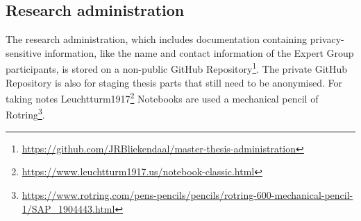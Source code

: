 \subsection{Research administration}
\label{sub:tbresearchadministration}
The research administration, which includes documentation containing privacy-sensitive information, like the name and contact information of the Expert Group participants, is stored on a non-public GitHub Repository\footnote{\url{https://github.com/JRBliekendaal/master-thesis-administration}}. The private GitHub Repository is also for staging thesis parts that still need to be anonymised. For taking notes Leuchtturm1917\footnote{\url{https://www.leuchtturm1917.us/notebook-classic.html}} Notebooks are used a mechanical pencil of Rotring\footnote{\url{https://www.rotring.com/pens-pencils/pencils/rotring-600-mechanical-pencil-1/SAP_1904443.html}}.

